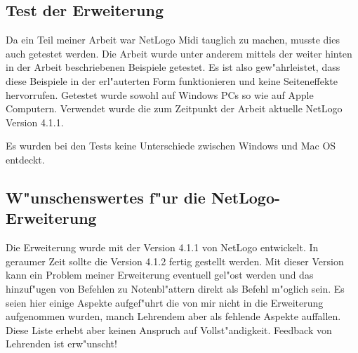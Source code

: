 \subsection{Test der Erweiterung}
Da ein Teil meiner Arbeit war NetLogo\cite{NetLogo} Midi tauglich zu machen,
musste dies auch getestet werden. 
Die Arbeit wurde unter anderem mittels der weiter hinten in der Arbeit 
beschriebenen Beispiele
getestet. Es ist also gew"ahrleistet, dass diese Beispiele in der erl"auterten
Form funktionieren und keine Seiteneffekte hervorrufen. 
Getestet wurde sowohl auf Windows PCs so wie auf Apple Computern. 
Verwendet wurde die zum Zeitpunkt der Arbeit aktuelle NetLogo Version 4.1.1. 

Es wurden bei den Tests keine Unterschiede zwischen Windows und Mac OS entdeckt.


\subsection{W"unschenswertes f"ur die NetLogo-Erweiterung}
Die Erweiterung wurde mit der Version 4.1.1 von NetLogo entwickelt. In geraumer
Zeit sollte die Version 4.1.2 fertig gestellt werden. Mit dieser Version kann
ein Problem meiner Erweiterung eventuell gel"ost werden und das hinzuf"ugen von
Befehlen zu Notenbl"attern direkt als Befehl m"oglich sein. Es seien hier einige
Aspekte aufgef"uhrt die von mir nicht in die Erweiterung aufgenommen wurden,
manch Lehrendem aber als fehlende Aspekte auffallen. Diese Liste erhebt aber keinen
Anspruch auf Vollst"andigkeit. Feedback von Lehrenden ist erw"unscht!

